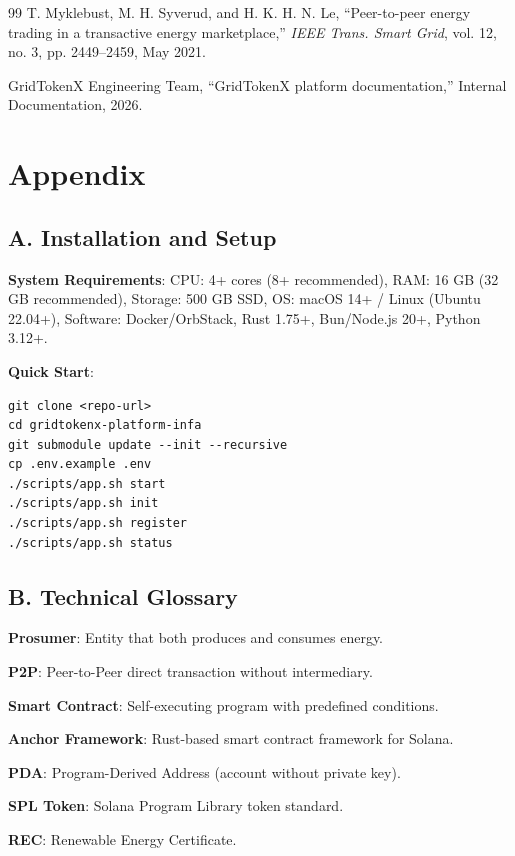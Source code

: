 \documentclass[conference]{IEEEtran}
\begin{document}
\begin{thebibliography}{99}
T. Myklebust, M. H. Syverud, and H. K. H. N. Le, ``Peer-to-peer energy trading in a transactive energy marketplace,'' \emph{IEEE Trans. Smart Grid}, vol. 12, no. 3, pp. 2449--2459, May 2021.

GridTokenX Engineering Team, ``GridTokenX platform documentation,'' Internal Documentation, 2026.

\end{thebibliography}

\section*{Appendix}

\subsection*{A. Installation and Setup}

\textbf{System Requirements}: CPU: 4+ cores (8+ recommended), RAM: 16 GB (32 GB recommended), Storage: 500 GB SSD, OS: macOS 14+ / Linux (Ubuntu 22.04+), Software: Docker/OrbStack, Rust 1.75+, Bun/Node.js 20+, Python 3.12+.

\textbf{Quick Start}:
\begin{verbatim}
git clone <repo-url>
cd gridtokenx-platform-infa
git submodule update --init --recursive
cp .env.example .env
./scripts/app.sh start
./scripts/app.sh init
./scripts/app.sh register
./scripts/app.sh status
\end{verbatim}

\subsection*{B. Technical Glossary}

\textbf{Prosumer}: Entity that both produces and consumes energy.

\textbf{P2P}: Peer-to-Peer direct transaction without intermediary.

\textbf{Smart Contract}: Self-executing program with predefined conditions.

\textbf{Anchor Framework}: Rust-based smart contract framework for Solana.

\textbf{PDA}: Program-Derived Address (account without private key).

\textbf{SPL Token}: Solana Program Library token standard.

\textbf{REC}: Renewable Energy Certificate.
\end{document}
